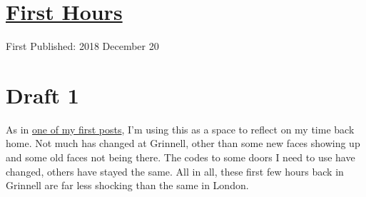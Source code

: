 \documentclass[12pt]{article}[titlepage]
\newcommand{\1}{\={a}}
\newcommand{\2}{\={e}}
\newcommand{\3}{\={\i}}
\newcommand{\4}{\=o}
\newcommand{\5}{\=u}
\newcommand{\6}{\={A}}
\renewcommand{\,}{\textsuperscript{,}}
\begin{document}
\doublespacing
\section{\href{first-hours.html}{First Hours}}
First Published: 2018 December 20
\section{Draft 1}
As in \href{first-56-hours.html}{one of my first posts}, I'm using this as a space to reflect on my time back home.
Not much has changed at Grinnell, other than some new faces showing up and some old faces not being there.
The codes to some doors I need to use have changed, others have stayed the same.
All in all, these first few hours back in Grinnell are far less shocking than the same in London.
\end{document}
